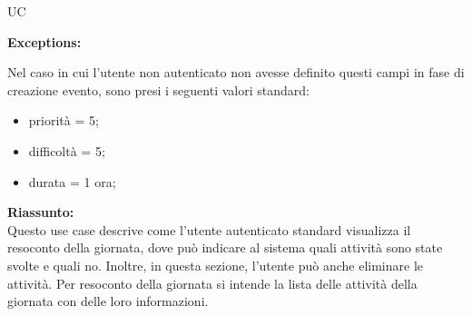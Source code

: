 \begin{listaPersonale}{UC}
\begin{listaPersonale2} [UC] {}
        \textbf{Exceptions:}
        \begin{enumerate}[label=\textbf{[exception \arabic{enumiii}]}, ref= \textbf{[exception \arabic{enumiii}]}]
             Nel caso in cui l'utente non autenticato non avesse definito questi campi in fase di creazione evento, sono presi i seguenti valori standard:
            \begin{itemize}
                \item priorità = 5;
                \item difficoltà = 5;
                \item durata = 1 ora;
            \end{itemize}
        \end{enumerate}
    \end{listaPersonale2}






    \newpage


    \begin{center}
        
    \end{center}

    \textbf{Riassunto:} \\
    Questo use case descrive come l'utente autenticato standard visualizza il resoconto della giornata, dove può indicare al sistema quali attività sono state svolte e quali no. Inoltre, in questa sezione, l'utente può anche eliminare le attività. Per resoconto della giornata si intende la lista delle attività della giornata con delle loro informazioni.


\end{listaPersonale}
